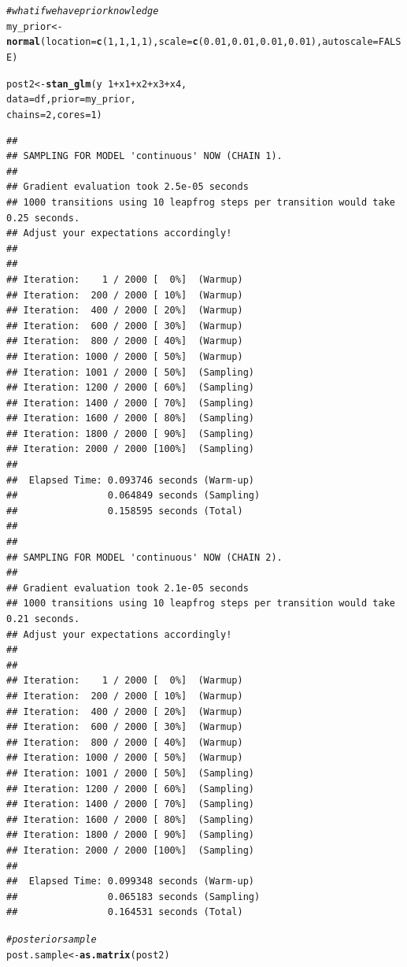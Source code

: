 \documentclass[11pt,a4paper,twoside]{book}\usepackage[]{graphicx}\usepackage[]{color}
\makeatletter
\newcommand{\hlnum}[1]{\textcolor[rgb]{0.686,0.059,0.569}{#1}}%
\newcommand{\hlcom}[1]{\textcolor[rgb]{0.678,0.584,0.686}{\textit{#1}}}%
\newcommand{\hlopt}[1]{\textcolor[rgb]{0,0,0}{#1}}%
\newcommand{\hlstd}[1]{\textcolor[rgb]{0.345,0.345,0.345}{#1}}%
\newcommand{\hlkwb}[1]{\textcolor[rgb]{0.69,0.353,0.396}{#1}}%
\newcommand{\hlkwc}[1]{\textcolor[rgb]{0.333,0.667,0.333}{#1}}%
\newcommand{\hlkwd}[1]{\textcolor[rgb]{0.737,0.353,0.396}{\textbf{#1}}}%
\newenvironment{kframe}{%
 \def\at@end@of@kframe{}%
 \ifinner\ifhmode%
  \def\at@end@of@kframe{\end{minipage}}%
  \begin{minipage}{\columnwidth}%
 \fi\fi%
 \def\FrameCommand##1{\hskip\@totalleftmargin \hskip-\fboxsep
 \colorbox{shadecolor}{##1}\hskip-\fboxsep
     \hskip-\linewidth \hskip-\@totalleftmargin \hskip\columnwidth}%
 \MakeFramed {\advance\hsize-\width
   \@totalleftmargin\z@ \linewidth\hsize
   \@setminipage}}%
 {\par\unskip\endMakeFramed%
 \at@end@of@kframe}
\newenvironment{knitrout}{}{} %
\makeatother
\begin{document}
\begin{knitrout}
\begin{kframe}
\begin{alltt}
\hlcom{#what if we have prior knowledge}
\hlstd{my_prior} \hlkwb{<-} \hlkwd{normal}\hlstd{(}\hlkwc{location} \hlstd{=} \hlkwd{c}\hlstd{(}\hlnum{1}\hlstd{,} \hlnum{1}\hlstd{,}\hlnum{1}\hlstd{,}\hlnum{1}\hlstd{),} \hlkwc{scale} \hlstd{=} \hlkwd{c}\hlstd{(}\hlnum{0.01}\hlstd{,} \hlnum{0.01}\hlstd{,}\hlnum{0.01}\hlstd{,}\hlnum{0.01}\hlstd{),} \hlkwc{autoscale} \hlstd{=} \hlnum{FALSE}\hlstd{)}

\hlstd{post2} \hlkwb{<-} \hlkwd{stan_glm}\hlstd{(y} \hlopt{~} \hlnum{1} \hlopt{+} \hlstd{x1} \hlopt{+} \hlstd{x2} \hlopt{+} \hlstd{x3} \hlopt{+} \hlstd{x4,}
                  \hlkwc{data} \hlstd{= df,} \hlkwc{prior} \hlstd{= my_prior,}
                  \hlkwc{chains} \hlstd{=} \hlnum{2}\hlstd{,} \hlkwc{cores} \hlstd{=} \hlnum{1}\hlstd{)}
\end{alltt}
\begin{verbatim}
## 
## SAMPLING FOR MODEL 'continuous' NOW (CHAIN 1).
## 
## Gradient evaluation took 2.5e-05 seconds
## 1000 transitions using 10 leapfrog steps per transition would take 0.25 seconds.
## Adjust your expectations accordingly!
## 
## 
## Iteration:    1 / 2000 [  0%]  (Warmup)
## Iteration:  200 / 2000 [ 10%]  (Warmup)
## Iteration:  400 / 2000 [ 20%]  (Warmup)
## Iteration:  600 / 2000 [ 30%]  (Warmup)
## Iteration:  800 / 2000 [ 40%]  (Warmup)
## Iteration: 1000 / 2000 [ 50%]  (Warmup)
## Iteration: 1001 / 2000 [ 50%]  (Sampling)
## Iteration: 1200 / 2000 [ 60%]  (Sampling)
## Iteration: 1400 / 2000 [ 70%]  (Sampling)
## Iteration: 1600 / 2000 [ 80%]  (Sampling)
## Iteration: 1800 / 2000 [ 90%]  (Sampling)
## Iteration: 2000 / 2000 [100%]  (Sampling)
## 
##  Elapsed Time: 0.093746 seconds (Warm-up)
##                0.064849 seconds (Sampling)
##                0.158595 seconds (Total)
## 
## 
## SAMPLING FOR MODEL 'continuous' NOW (CHAIN 2).
## 
## Gradient evaluation took 2.1e-05 seconds
## 1000 transitions using 10 leapfrog steps per transition would take 0.21 seconds.
## Adjust your expectations accordingly!
## 
## 
## Iteration:    1 / 2000 [  0%]  (Warmup)
## Iteration:  200 / 2000 [ 10%]  (Warmup)
## Iteration:  400 / 2000 [ 20%]  (Warmup)
## Iteration:  600 / 2000 [ 30%]  (Warmup)
## Iteration:  800 / 2000 [ 40%]  (Warmup)
## Iteration: 1000 / 2000 [ 50%]  (Warmup)
## Iteration: 1001 / 2000 [ 50%]  (Sampling)
## Iteration: 1200 / 2000 [ 60%]  (Sampling)
## Iteration: 1400 / 2000 [ 70%]  (Sampling)
## Iteration: 1600 / 2000 [ 80%]  (Sampling)
## Iteration: 1800 / 2000 [ 90%]  (Sampling)
## Iteration: 2000 / 2000 [100%]  (Sampling)
## 
##  Elapsed Time: 0.099348 seconds (Warm-up)
##                0.065183 seconds (Sampling)
##                0.164531 seconds (Total)
\end{verbatim}
\begin{alltt}
\hlcom{#posterior sample}
\hlstd{post.sample} \hlkwb{<-} \hlkwd{as.matrix}\hlstd{(post2)}


\end{alltt}
\end{kframe}
\end{knitrout}
\end{document}
